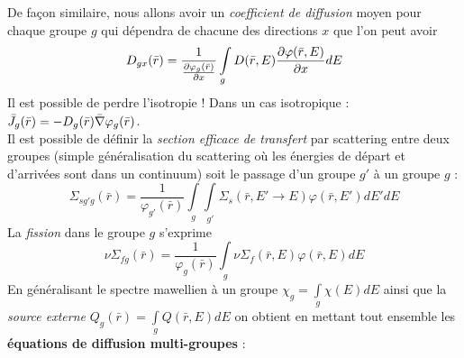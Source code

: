 De façon similaire, nous allons avoir un \textit{coefficient de diffusion }moyen pour chaque groupe $g$ qui dépendra de chacune des directions $x$ que l'on peut avoir
\begin{equation}
{D_{gx}}(\bar r) = \frac{1}{{{\textstyle{{\partial {\varphi _g}(\bar r)} \over {\partial x}}}}}\int\limits_g   D(\bar r,E)\frac{{\partial \varphi (\bar r,E)}}{{\partial x}}dE
\end{equation}
Il est possible de perdre l'isotropie ! Dans un cas isotropique : $\displaystyle{\bar J_g}(\bar r) =  - {D_g}(\bar r)\bar \nabla {\varphi _g}(\bar r)$.\\

Il est possible de définir la \textit{section efficace de transfert} par scattering entre deux groupes 
(simple généralisation du scattering où les énergies de départ et d'arrivées sont dans un 
continuum) soit le passage d'un groupe $g'$ à un groupe $g$ :
\begin{equation}
{\Sigma _{sg'g}}(\bar r) = \frac{1}{{{\varphi _{g'}}(\bar r)}}\int\limits_g    \int\limits_{g'}    {\Sigma _s}(\bar r,E' \to E)\varphi (\bar r,E')dE'dE
\end{equation}
La \textit{fission} dans le groupe $g$ s'exprime
\begin{equation}
\nu {\Sigma _{fg}}(\bar r) = \frac{1}{{{\varphi _g}(\bar r)}}\int\limits_g   \nu {\Sigma _f}(\bar r,E)\varphi (\bar r,E)dE
\end{equation}
En généralisant le spectre mawellien à un groupe ${\chi _g} = \int\limits_g    \chi (E)dE$ ainsi 
que la \textit{source externe} ${Q_g}(\bar r) = \int\limits_g    Q(\bar r,E)dE$ on obtient en 
mettant tout ensemble les \textbf{équations de diffusion multi-groupes} :\\

\ \\

